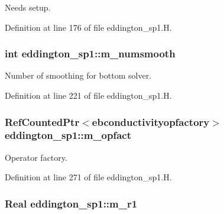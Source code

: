 Needs setup. 



Definition at line 176 of file eddington\+\_\+sp1.\+H.

\subsubsection[{\texorpdfstring{m\+\_\+numsmooth}{m_numsmooth}}]{\setlength{\rightskip}{0pt plus 5cm}int eddington\+\_\+sp1\+::m\+\_\+numsmooth\hspace{0.3cm}{\ttfamily [protected]}}\hypertarget{classeddington__sp1_aa17b377231e6868460691beea22cd47c}{}\label{classeddington__sp1_aa17b377231e6868460691beea22cd47c}


Number of smoothing for bottom solver. 



Definition at line 221 of file eddington\+\_\+sp1.\+H.

\subsubsection[{\texorpdfstring{m\+\_\+opfact}{m_opfact}}]{\setlength{\rightskip}{0pt plus 5cm}Ref\+Counted\+Ptr$<${\bf ebconductivityopfactory}$>$ eddington\+\_\+sp1\+::m\+\_\+opfact\hspace{0.3cm}{\ttfamily [protected]}}\hypertarget{classeddington__sp1_a302e326fd8666c8fd04bcad143d96597}{}\label{classeddington__sp1_a302e326fd8666c8fd04bcad143d96597}


Operator factory. 



Definition at line 271 of file eddington\+\_\+sp1.\+H.

\subsubsection[{\texorpdfstring{m\+\_\+r1}{m_r1}}]{\setlength{\rightskip}{0pt plus 5cm}Real eddington\+\_\+sp1\+::m\+\_\+r1\hspace{0.3cm}{\ttfamily [protected]}}\hypertarget{classeddington__sp1_aec8e40277933ad5d0073038c4c9672b3}{}\label{classeddington__sp1_aec8e40277933ad5d0073038c4c9672b3}


